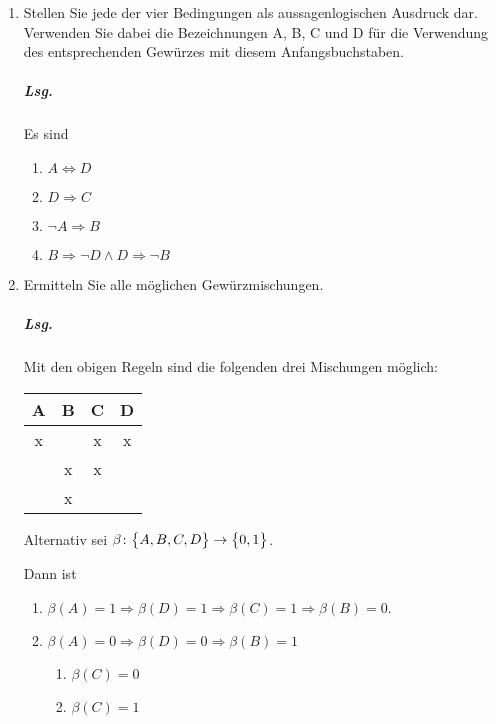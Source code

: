 \documentclass{scrreprt}
\begin{document}
\begin{enumerate}
\item Stellen Sie jede der vier Bedingungen als aussagenlogischen Ausdruck dar.
  Verwenden Sie dabei die Bezeichnungen A, B, C und D für die Verwendung des
  entsprechenden Gewürzes mit diesem Anfangsbuchstaben.

  \subparagraph{Lsg.} Es sind
  \begin{enumerate}[(1)]
  \item $A \iff D$
  \item $D \Rightarrow C$
  \item $\neg A \Rightarrow B$
  \item $B \Rightarrow \neg D \land D \Rightarrow \neg B$
  \end{enumerate}

\item Ermitteln Sie alle möglichen Gewürzmischungen.

  \subparagraph{Lsg.} Mit den obigen Regeln sind die folgenden drei Mischungen
  möglich:

  \begin{tabular}{|c|c|c|c|}
    \hline
    A & B & C & D \\
    \hline
    x &  & x & x \\
      & x & x &  \\
      & x & & \\
    \hline
  \end{tabular}

  Alternativ sei $\beta \colon \qty\big{A, B, C, D} \to \qty\big{0, 1}$.

  Dann ist
  \begin{enumerate}[1. Fall:]
  \item $\beta(A) = 1 \Rightarrow \beta(D) = 1 \Rightarrow \beta(C) = 1 \Rightarrow \beta(B) = 0$.
  \item $\beta(A) = 0 \Rightarrow \beta(D) = 0 \Rightarrow \beta(B) = 1$
    \begin{enumerate}[(1)]
    \item $\beta(C) = 0$
    \item $\beta(C) = 1$
    \end{enumerate}
  \end{enumerate}

\end{enumerate}

\newpage
\end{document}
